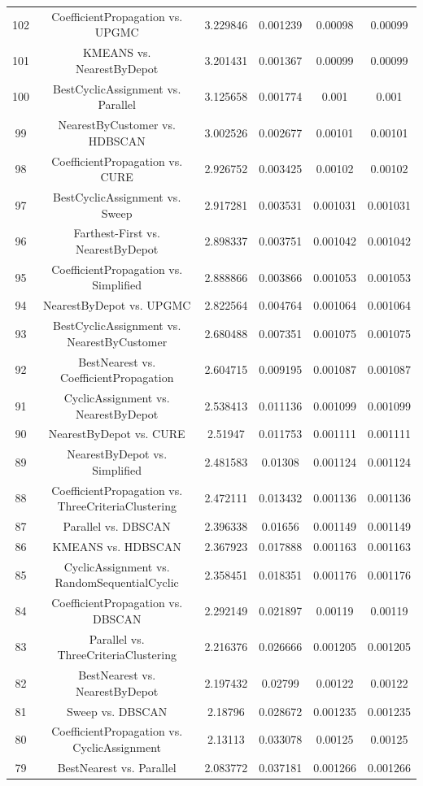 \documentclass[a4paper,10pt]{article}
\begin{document}
\begin{landscape}
\begin{table}[!htp]
\begin{tabular}{cccccc}
102&CoefficientPropagation vs. UPGMC&3.229846&0.001239&0.00098&0.00099\\
101&KMEANS vs. NearestByDepot&3.201431&0.001367&0.00099&0.00099\\
100&BestCyclicAssignment vs. Parallel&3.125658&0.001774&0.001&0.001\\
99&NearestByCustomer vs. HDBSCAN&3.002526&0.002677&0.00101&0.00101\\
98&CoefficientPropagation vs. CURE&2.926752&0.003425&0.00102&0.00102\\
97&BestCyclicAssignment vs. Sweep&2.917281&0.003531&0.001031&0.001031\\
96&Farthest-First vs. NearestByDepot&2.898337&0.003751&0.001042&0.001042\\
95&CoefficientPropagation vs. Simplified&2.888866&0.003866&0.001053&0.001053\\
94&NearestByDepot vs. UPGMC&2.822564&0.004764&0.001064&0.001064\\
93&BestCyclicAssignment vs. NearestByCustomer&2.680488&0.007351&0.001075&0.001075\\
92&BestNearest vs. CoefficientPropagation&2.604715&0.009195&0.001087&0.001087\\
91&CyclicAssignment vs. NearestByDepot&2.538413&0.011136&0.001099&0.001099\\
90&NearestByDepot vs. CURE&2.51947&0.011753&0.001111&0.001111\\
89&NearestByDepot vs. Simplified&2.481583&0.01308&0.001124&0.001124\\
88&CoefficientPropagation vs. ThreeCriteriaClustering&2.472111&0.013432&0.001136&0.001136\\
87&Parallel vs. DBSCAN&2.396338&0.01656&0.001149&0.001149\\
86&KMEANS vs. HDBSCAN&2.367923&0.017888&0.001163&0.001163\\
85&CyclicAssignment vs. RandomSequentialCyclic&2.358451&0.018351&0.001176&0.001176\\
84&CoefficientPropagation vs. DBSCAN&2.292149&0.021897&0.00119&0.00119\\
83&Parallel vs. ThreeCriteriaClustering&2.216376&0.026666&0.001205&0.001205\\
82&BestNearest vs. NearestByDepot&2.197432&0.02799&0.00122&0.00122\\
81&Sweep vs. DBSCAN&2.18796&0.028672&0.001235&0.001235\\
80&CoefficientPropagation vs. CyclicAssignment&2.13113&0.033078&0.00125&0.00125\\
79&BestNearest vs. Parallel&2.083772&0.037181&0.001266&0.001266\\

\end{tabular}
\end{table}
\end{landscape}
\end{document}
